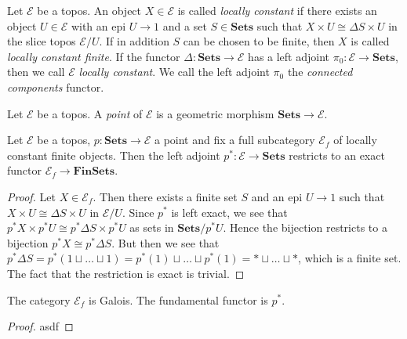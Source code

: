 \begin{definition}
Let $\mathscr{E}$ be a topos. An object $X \in \mathscr{E}$ is called \emph{locally constant} if there exists an object $U \in \mathscr{E}$ with an epi $U \to 1$ and a set $S \in \mathbf{Sets}$ such that $X \times U \cong \Delta S \times U$ in the slice topos $\mathscr{E}/U$.
If in addition $S$ can be chosen to be finite, then $X$ is called \emph{locally constant finite}.
If the functor $\Delta : \mathbf{Sets} \to \mathscr{E}$ has a left adjoint $\pi_0 : \mathscr{E} \to \mathbf{Sets}$, then we call $\mathscr{E}$ \emph{locally constant}. We call the left adjoint $\pi_0$ the \emph{connected components} functor.
\end{definition}

\begin{definition}
Let $\mathscr{E}$ be a topos. A \emph{point} of $\mathscr{E}$ is a geometric morphism $\mathbf{Sets} \to \mathscr{E}$.
\end{definition}

\begin{proposition}
Let $\mathscr{E}$ be a topos, $p : \mathbf{Sets} \to \mathscr{E}$ a point and fix a full subcategory $\mathscr{E}_{f}$ of locally constant finite objects. Then the left adjoint $p^* : \mathscr{E} \to \mathbf{Sets}$ restricts to an exact functor $\mathscr{E}_{f} \to \mathbf{FinSets}$.
\end{proposition}

\begin{proof}
Let $X \in \mathscr{E}_f$. Then there exists a finite set $S$ and an epi $U \to 1$ such that $X \times U \cong \Delta S \times U$ in $\mathscr{E}/U$. Since $p^*$ is left exact, we see that $p^*X \times p^*U \cong p^* \Delta S \times p^* U$ as sets in $\mathbf{Sets}/p^*U$. Hence the bijection restricts to a bijection $p^*X \cong p^* \Delta S$. But then we see that $p^* \Delta S = p^* \left( 1 \sqcup \ldots \sqcup 1 \right) = p^*(1) \sqcup \ldots \sqcup p^*(1) = * \sqcup \ldots \sqcup *$, which is a finite set. The fact that the restriction is exact is trivial.
\end{proof}

\begin{proposition}
The category $\mathscr{E}_f$ is Galois. The fundamental functor is $p^*$.
\end{proposition}
\begin{proof}
asdf
\end{proof}

